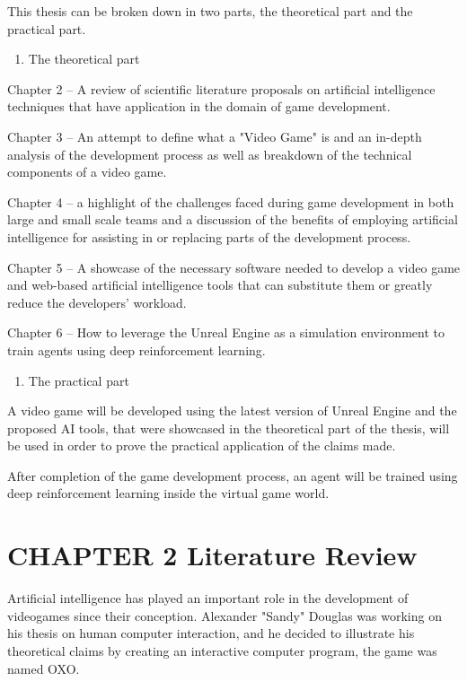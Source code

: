\documentclass[a4paper,one side,12pt]{book}
\begin{document}
This thesis can be broken down in two parts, the theoretical part and
the practical part.


\begin{enumerate}
\def\labelenumi{\arabic{enumi}.}
\item
  {The theoretical part}
\end{enumerate}

Chapter 2 -- A review of scientific literature proposals on artificial
intelligence techniques that have application in the domain of game
development.

Chapter 3 -- An attempt to define what a "Video Game" is and an
in-depth analysis of the development process as well as breakdown of the
technical components of a video game.

Chapter 4 -- a highlight of the challenges faced during game development
in both large and small scale teams and a discussion of the benefits of
employing artificial intelligence for assisting in or replacing parts of
the development process.

Chapter 5 -- A showcase of the necessary software needed to develop a
video game and web-based artificial intelligence tools that can
substitute them or greatly reduce the developers' workload.

Chapter 6 -- How to leverage the Unreal Engine as a simulation
environment to train agents using deep reinforcement learning.

\begin{enumerate}
\def\labelenumi{\arabic{enumi}.}
\setcounter{enumi}{1}
\item
  {The practical part}
\end{enumerate}

A video game will be developed using the latest version of Unreal Engine
and the proposed AI tools, that were showcased in the theoretical part
of the thesis, will be used in order to prove the practical application
of the claims made.

After completion of the game development process, an agent will be
trained using deep reinforcement learning inside the virtual game world.
\pagebreak


\chapter{CHAPTER 2 Literature
Review}

Artificial intelligence has played an important role in the development
of videogames since their conception. Alexander "Sandy" Douglas was
working on his thesis on human computer interaction, and he decided to
illustrate his theoretical claims by creating an interactive computer
program, the game was named OXO.\cite{Sandy}
\end{document}
